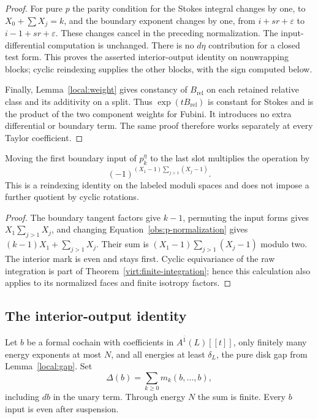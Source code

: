\begin{proof}
For pure $p$ the parity condition for the Stokes integral changes
by one, to $X_0+\sum X_j=k$, and the boundary exponent changes by
one, from $i+sr+\varepsilon$ to
$i-1+sr+\varepsilon$.  These changes cancel in the preceding
normalization.  The input-differential computation is unchanged.
There is no $d\eta$ contribution for a closed test form.  This
proves the asserted interior-output identity on nonwrapping
blocks; cyclic reindexing supplies the other blocks, with the
sign computed below.

Finally, Lemma~\ref{local:weight} gives constancy of
$B_{\mathrm{rel}}$ on each retained relative class and its
additivity on a split.  Thus
$\exp(tB_{\mathrm{rel}})$ is constant for Stokes and is the
product of the two component weights for Fubini.  It introduces
no extra differential or boundary term.  The same proof therefore
works separately at every Taylor coefficient.
\end{proof}

\begin{lemma}\label{obs:cyclic}
Moving the first boundary input of $p_k^\eta$ to the last slot
multiplies the operation by
\begin{equation}
 \label{obs:cyclic-sign}
 (-1)^{(X_1-1)\sum_{j>1}(X_j-1)}.
\end{equation}
This is a reindexing identity on the labeled moduli spaces and
does not impose a further quotient by cyclic rotations.
\end{lemma}

\begin{proof}
The boundary tangent factors give $k-1$, permuting the input
forms gives $X_1\sum_{j>1}X_j$, and changing
Equation~\eqref{obs:p-normalization} gives
$(k-1)X_1+\sum_{j>1}X_j$.  Their sum is
$(X_1-1)\sum_{j>1}(X_j-1)$ modulo two.  The interior mark is even
and stays first.  Cyclic equivariance of the raw integration is
part of Theorem~\ref{virt:finite-integration}; hence this
calculation also applies to its normalized faces and finite
isotropy factors.
\end{proof}

\subsection{The interior-output identity}

Let $b$ be a formal cochain with coefficients in
$A^{\bar1}(L)[[t]]$, only finitely many energy exponents at
most $N$, and all energies at least $\delta_L$, the pure
disk gap from Lemma~\ref{local:gap}.  Set
\begin{equation}
 \label{obs:curvature}
 \Delta(b)=\sum_{k\ge0}m_k(b,\ldots,b),
\end{equation}
including $db$ in the unary term.  Through energy $N$ the
sum is finite.  Every $b$ input is even after suspension.

